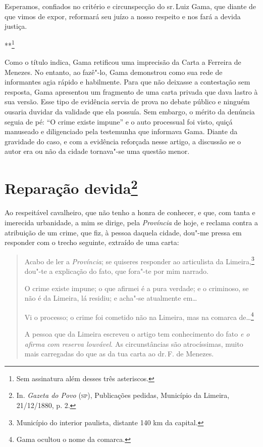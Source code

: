 Esperamos, confiados no critério e circunspecção do sr.\,Luiz Gama, que
diante de que vimos de expor, reformará seu juízo a nosso respeito e nos
fará a devida justiça.

\bigskip

\hfill***\footnote{Sem assinatura além desses três asteriscos.}

\paginabranca
\mbox{}\vfill
\thispagestyle{empty}

{\small\noindent
Como o título indica, Gama retificou uma imprecisão da Carta a
Ferreira de Menezes. No entanto, ao fazê"-lo, Gama demonstrou como sua
rede de informantes agia rápido e habilmente. Para que não deixasse a
contestação sem resposta, Gama apresentou um fragmento de uma carta
privada que dava lastro à sua versão. Esse tipo de evidência servia de
prova no debate público e ninguém ousaria duvidar da validade que ela
possuía. Sem embargo, o mérito da denúncia seguia de pé: ``O crime existe
impune'' e o auto processual foi visto, quiçá manuseado e diligenciado
pela testemunha que informava Gama. Diante da gravidade do caso, e com a
evidência reforçada nesse artigo, a discussão se o autor era ou não da
cidade tornava"-se uma questão menor. }

\chapter{Reparação devida\footnote[*]{In. \emph{Gazeta do Povo} (\textsc{sp}),
  Publicações pedidas, Município da Limeira, 21/12/1880, p. 2.}}


Ao respeitável cavalheiro, que não tenho a honra de conhecer, e que, com
tanta e imerecida urbanidade, a mim se dirige, pela \emph{Província} de
hoje, e reclama contra a atribuição de um crime, que fiz, à pessoa
daquela cidade, dou"-me pressa em responder com o trecho seguinte,
extraído de uma carta:

\noindent\dotfill{}

\begin{quote}
Acabo de ler a \emph{Província}; se quiseres responder ao articulista
da Limeira,\footnote{Município do interior paulista, distante 140 km da
  capital.} dou"-te a explicação do fato, que fora"-te por mim narrado.

O crime existe impune; o que afirmei é a pura verdade; e o criminoso, se
não é da Limeira, lá residiu; e acha"-se atualmente em\ldots{}

Vi o processo; o crime foi cometido não na Limeira, mas na comarca
de\ldots{}\footnote{Gama ocultou o nome da comarca.}

A pessoa que da Limeira
escreveu o artigo tem conhecimento do fato \emph{e o afirma com reserva
louvável}. As circunstâncias são atrocíssimas, muito mais carregadas do
que as da tua carta ao dr.\,F. de Menezes.
\end{quote}


